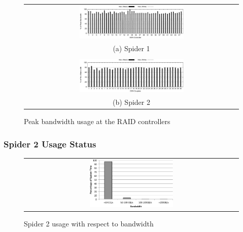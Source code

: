 \begin{figure}[!thb]
\begin{center}
\begin{tabular}{c}
{\includegraphics[width=0.50\textwidth]{./figs/spider1-bw-perc-max.eps}}\\
{(a) Spider 1}\\
\\
{\includegraphics[width=0.50\textwidth]{./figs/spider2-bw-perc-max.eps}}\\
{(b) Spider 2}\\
\end{tabular}
\vspace{-0.1in}
\caption{Peak bandwidth usage at the RAID controllers}
\label{fig:ddnpeakBW}
\end{center}
\end{figure}

\subsubsection{Spider 2 Usage Status}

\begin{figure}[!thb]
\begin{center}
\begin{tabular}{c}
{\includegraphics[width=0.40\textwidth]{./figs/bwUsage.eps}}\\
\end{tabular}
\vspace{-0.1in}
\caption{Spider 2 usage with respect to bandwidth}
\label{fig:bwUsage}
\end{center}
\end{figure}



